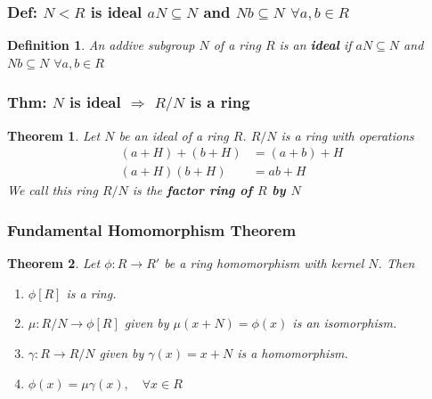 \documentclass[11pt,a4paper]{article}
\newtheorem{theorem}{Theorem}
\newtheorem{definition}{Definition}
\begin{document}
\subsubsection{Def: $N< R$ is ideal $aN\subseteq N$ and $Nb\subseteq N$ $\forall a,b\in R$}
\begin{definition}
    An addive subgroup $N$ of a ring $R$
    is an \textbf{ideal} if  $aN\subseteq N$ and $Nb\subseteq N$ $\forall a,b\in R$
\end{definition}

\subsubsection{Thm: $N$ is ideal $\Rightarrow$ $R/N$ is a ring}
\begin{theorem}
Let $N$ be an ideal of a ring $R$. $R/N$ is a ring with operations
\begin{equation}
    \begin{aligned}
        (a+H)+(b+H)&=(a+b)+H\\
        (a+H)(b+H)&=ab+H
    \end{aligned}
    \nonumber
\end{equation}
We call this ring $R/N$ is the \textbf{factor ring of $R$ by $N$}
\end{theorem}

\subsubsection{Fundamental Homomorphism Theorem}
\begin{theorem}
    Let $\phi: R \rightarrow R'$ be a ring homomorphism with kernel $N$. Then
    \begin{enumerate}
        \item $\phi[R]$ is a ring.
        \item $\mu: R/N \rightarrow \phi[R]$ given by $\mu(x+N)=\phi(x)$ is an isomorphism.
        \item $\gamma: R \rightarrow R/N$ given by $\gamma(x)=x+N$ is a homomorphism.
        \item $\phi(x)=\mu\gamma(x),\quad \forall x\in R$
    \end{enumerate}
\end{theorem}
\end{document}
